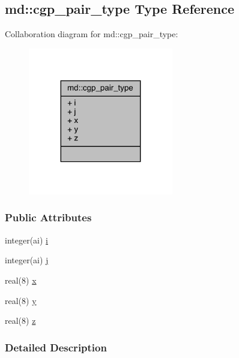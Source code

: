 \hypertarget{structmd_1_1cgp__pair__type}{\subsection{md\-:\-:cgp\-\_\-pair\-\_\-type Type Reference}
\label{structmd_1_1cgp__pair__type}
}


Collaboration diagram for md\-:\-:cgp\-\_\-pair\-\_\-type\-:
\nopagebreak
\begin{figure}[H]
\begin{center}
\leavevmode
\includegraphics[width=179pt]{structmd_1_1cgp__pair__type__coll__graph}
\end{center}
\end{figure}
\subsubsection*{Public Attributes}
\begin{DoxyCompactItemize}
\item 
integer(ai) \hyperlink{structmd_1_1cgp__pair__type_a30c406706bc2cf9b4c875bc8c8c0ec69}{i}
\item 
integer(ai) \hyperlink{structmd_1_1cgp__pair__type_a9177cf7fd4bc814564046885efdf05f5}{j}
\item 
real(8) \hyperlink{structmd_1_1cgp__pair__type_a22d261487ad976d6d2d8f93d32a61387}{x}
\item 
real(8) \hyperlink{structmd_1_1cgp__pair__type_aaea95754961401416dfd141e690b02f1}{y}
\item 
real(8) \hyperlink{structmd_1_1cgp__pair__type_a2228c355b34275a84b6ab7ccf60ed01e}{z}
\end{DoxyCompactItemize}


\subsubsection{Detailed Description}


